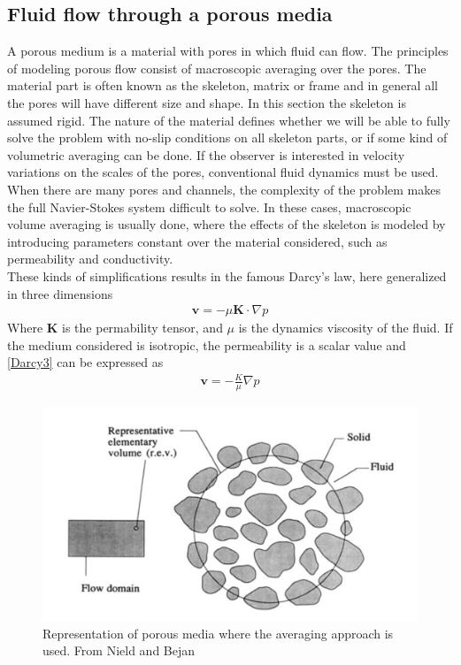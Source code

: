 \subsection{Fluid flow through a porous media}
A porous medium is a material with pores in which fluid can flow. The principles of modeling porous flow consist of macroscopic averaging over the pores. The material part is often known as the skeleton, matrix or frame and in general all the pores will have different size and shape. In this section the skeleton is assumed rigid. The nature of the material defines whether we will be able to fully solve the problem with no-slip conditions on all skeleton parts, or if some kind of volumetric averaging can be done. If the observer is interested in velocity variations on the scales of the pores, conventional fluid dynamics must be used. When there are many pores and channels, the complexity of the problem makes the full Navier-Stokes system difficult to solve. In these cases, macroscopic volume averaging is usually done, where the effects of the skeleton is modeled by introducing parameters constant over the material considered, such as permeability and conductivity. 
\\
These kinds of simplifications results in the famous Darcy's law, here generalized in three dimensions
\begin{align}
\mathbf{v} = -\mu \mathbf{K} \cdot \nabla p \label{Darcy3}
\end{align}
Where $\mathbf{K}$ is the permability tensor, and $\mu$ is the dynamics viscosity of the fluid. If the medium considered is isotropic, the permeability is a scalar value and \eqref{Darcy3} can be expressed as
\begin{align}
\mathbf{v} = -\frac{K}{\mu} \nabla p \label{Darcy}
\end{align}
\begin{center}
\begin{figure}[!ht]
\includegraphics[scale=0.3]{figures/Porous_REV}
\caption{Representation of porous media where the averaging approach is used. From Nield and Bejan}
\end{figure}
\end{center}
